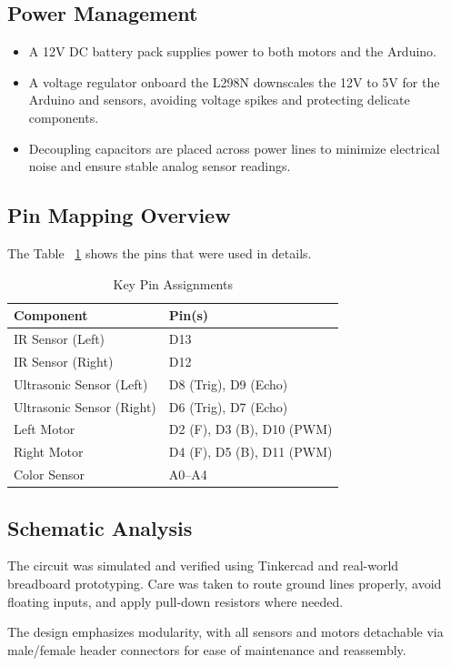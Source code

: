\documentclass[conference]{IEEEtran}
\begin{document}
\subsection{Power Management}
\begin{itemize}
  \item A 12V DC battery pack supplies power to both motors and the Arduino.
  \item A voltage regulator onboard the L298N downscales the 12V to 5V for the Arduino and sensors, avoiding voltage spikes and protecting delicate components.
  \item Decoupling capacitors are placed across power lines to minimize electrical noise and ensure stable analog sensor readings.
\end{itemize}

\subsection{Pin Mapping Overview}
The Table ~\ref{tab:pinmap} shows the pins that were used in details.
\begin{table}[H]
\centering
\caption{Key Pin Assignments}
\label{tab:pinmap}
\begin{tabular}{|l|l|}
\hline
\textbf{Component} & \textbf{Pin(s)} \\ \hline
IR Sensor (Left) & D13 \\ \hline
IR Sensor (Right) & D12 \\ \hline
Ultrasonic Sensor (Left) & D8 (Trig), D9 (Echo) \\ \hline
Ultrasonic Sensor (Right) & D6 (Trig), D7 (Echo) \\ \hline
Left Motor & D2 (F), D3 (B), D10 (PWM) \\ \hline
Right Motor & D4 (F), D5 (B), D11 (PWM) \\ \hline
Color Sensor & A0–A4 \\ \hline
\end{tabular}
\end{table}

\subsection{Schematic Analysis}
The circuit was simulated and verified using Tinkercad and real-world breadboard prototyping. Care was taken to route ground lines properly, avoid floating inputs, and apply pull-down resistors where needed.

The design emphasizes modularity, with all sensors and motors detachable via male/female header connectors for ease of maintenance and reassembly.
\end{document}
